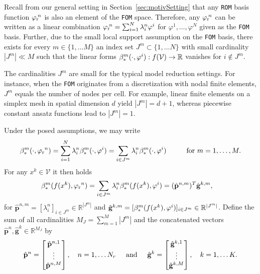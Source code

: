\documentclass[onefignum,onetabnum]{siamart251104}
\newcommand{\bv}[1]{{\mathbf #1}}
\newcommand{\funSpace}[1]{\mathcal{#1}}
\newcommand{\rom}[1]{{{#1}_{\rm{r}}}}
\newcommand{\Nr}{{N_r}}
\newcommand{\R}{\mathbb{R}}
\newcommand{\tL}{{\fs{\varphi}}}
\newcommand{\fs}[1]{{{#1}}} %
\newcommand{\acro}[1]{{\texttt{#1}}}  %
\begin{document}
Recall from our general setting in Section~\ref{sec:motivSetting} that any \acro{ROM} basis function $\rom{\tL}\!^n$ is also an element of the \acro{FOM} space. Therefore, any $\rom{\tL}\!^n$ can be written as a linear combination $ \rom{\tL}\!^n= \sum_{i=1}^N \lambda_i^n \tL^i$ for $\tL^1, \ldots, \tL^N$ given as the \acro{FOM} basis. Further, due to the small local support assumption on the \acro{FOM} basis, there exists for every $m \in \{1, \ldots M \}$ an index set $J^m \subset \{1, \ldots N \}$ with small cardinality $|J^m | \ll M$ such that the linear forms $\beta_{\rm{*}}^m(\cdot, \tL^i): f(\funSpace{V}) \to \R$ vanishes for $i \notin J^m$.
%
\begin{rmrk}
The cardinalities $J^m$ are small for the typical model reduction settings. For instance, when the \acro{FOM} originates from a discretization with nodal finite elements, $J^m$ equals the number of nodes per cell. For example, linear finite elements on a simplex mesh in spatial dimension $d$ yield $|J^m| = d+1$, whereas piecewise constant ansatz functions lead to $|J^m| = 1$.
\end{rmrk}
Under the posed assumptions, we may write
\begin{align*}
	\beta_{\rm{*}}^m(\cdot, \rom{\tL}^n) = \sum_{i= 1}^N \lambda_i^n \beta_{\rm{*}}^m(\cdot, \tL^i) = \sum_{i\in J^m} \lambda_i^n \beta_{\rm{*}}^m(\cdot, \tL^i) \hspace{1cm} \text{for } m = 1,\ldots, M.
\end{align*}
For any $x^k \in \funSpace{V}$ it then holds
\begin{align*}
	\beta_{\rm{*}}^m(f(x^k), \rom{\tL}^n) &=  \sum_{i\in J^m} \lambda_i^n \beta_{\rm{*}}^m(f(x^k), \tL^i) =  (\hat{\bv{p}}^{n,m})^T \hat{\bv{g}}^{k,m},
\end{align*}
for $\hat{\bv{p}}^{n,m}= [\lambda^n_i]_{i\in J^m} \in  \R^{|J^m|}$  and $\hat{\bv{g}}^{k,m}= [\beta_{\rm{*}}^m(f(x^k), \tL^i)]_{i\in J^m} \in  \R^{|J^m|}$. 
Define the sum of all cardinalities $M_J= \sum_{m=1}^M |J^m|$ and the concatenated vectors $\hat{\bv{p}}^{n}, \hat{\bv{g}}^{k} \in \R^{M_J}$ by
{\small
\begin{align*}
\hat{\bv{p}}^{n}=  \begin{bmatrix}
\hat{\bv{p}}^{n,1} \\ \vdots \\ \hat{\bv{p}}^{n,M}
\end{bmatrix}, \quad n = 1,\ldots \Nr \hspace{0.5cm} \text{and} \hspace{0.5cm}
\hat{\bv{g}}^{k}=  \begin{bmatrix}
\hat{\bv{g}}^{k,1} \\ \vdots \\ \hat{\bv{g}}^{k,M}
\end{bmatrix},  \quad k = 1,\ldots K.
\end{align*}
}%
\end{document}
